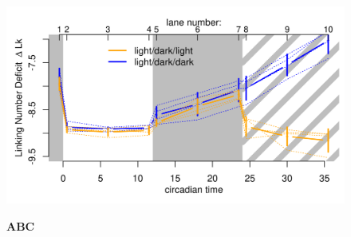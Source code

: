 \documentclass[10pt,a4]{article}
\begin{document}
\begin{figure}
\begin{minipage}{.33\textwidth}
  \end{minipage}
  \begin{minipage}{.39\textwidth}
    \includegraphics[width=\textwidth]{figures/diurnal/linkingNumbers.png}
  \end{minipage}
   
  \vspace{-.75cm}
  \textbf{A}\hspace{.26\textwidth}\textbf{B}\hspace{.33\textwidth}\textbf{C}
  \vspace{.25cm}
  

\end{figure}
\end{document}
